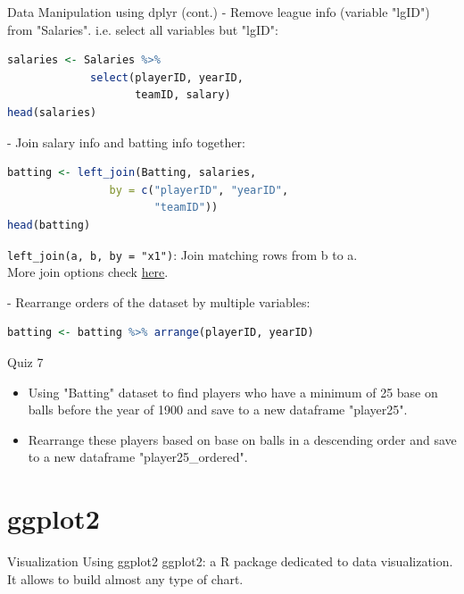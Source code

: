 \documentclass{beamer}
\begin{document}
\begin{frame}[fragile]{Data Manipulation using dplyr (cont.)}
- Remove league info (variable "lgID") from "Salaries". i.e. select all variables but "lgID":
\begin{lstlisting}[language=R]
salaries <- Salaries %>%
             select(playerID, yearID, 
                    teamID, salary)
head(salaries)
\end{lstlisting}

- Join salary info and batting info together:
\begin{lstlisting}[language=R]
batting <- left_join(Batting, salaries, 
                by = c("playerID", "yearID", 
                       "teamID"))
head(batting)
\end{lstlisting}

\texttt{left\_join(a, b, by = "x1")}: Join matching rows from b to a.\\
More join options check \href{https://www.rstudio.com/wp-content\%2Fuploads\%2F2015\%2F02\%2Fdata-wrangling-cheatsheet.pdf\%2F}{here}.

- Rearrange orders of the dataset by multiple variables:
\begin{lstlisting}[language=R]
batting <- batting %>% arrange(playerID, yearID)
\end{lstlisting}

\end{frame}

\begin{frame}{Quiz 7}

\begin{itemize}
    \item Using "Batting" dataset to find players who have a minimum of 25 base on balls before the year of 1900 and save to a new dataframe "player25".
    \item Rearrange these players based on base on balls in a descending order and save to a new dataframe "player25\_ordered".
\end{itemize}
\end{frame}

\section{ggplot2}

\begin{frame}{Visualization Using ggplot2}
    ggplot2: a R package dedicated to data visualization. It allows to build almost any type of chart.
\end{frame}
\end{document}
